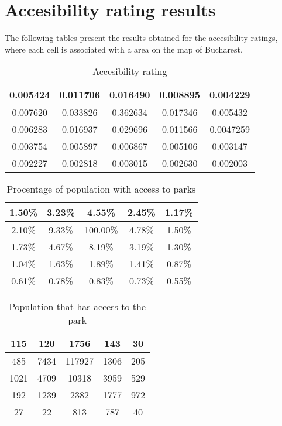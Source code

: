 \chapter{Accesibility rating results}
\label{chap:acc-rating}

The following tables present the results obtained for the accesibility ratings, where each cell is associated with a area on the map of Bucharest.

\begin{center}
\begin{table}[htb]
  \caption{Accesibility rating}
  \begin{tabular}{|c|c|c|c|c|}
	\hline
   	0.005424 	& 	0.011706	& 	0.016490	&	0.008895	& 	0.004229 \\
	\hline
   	0.007620 	& 	0.033826	& 	0.362634	&	0.017346	& 	0.005432 \\
	\hline
   	0.006283 	& 	0.016937	& 	0.029696	&	0.011566	& 	0.0047259 \\
	\hline
   	0.003754 	& 	0.005897	& 	0.006867	&	0.005106	& 	0.003147 \\
	\hline
   	0.002227 	& 	0.002818	& 	0.003015	&	0.002630	& 	0.002003 \\
	\hline
  \end{tabular}
  \label{table:reports}
\end{table}
\end{center}


\begin{center}
\begin{table}[htb]
  \caption{Procentage of population with access to parks}
  \begin{tabular}{|c|c|c|c|c|}
	\hline
	1.50\%		&	3.23\%		&	4.55\%		&	2.45\%		&	1.17\% \\
	\hline
	2.10\%		&	9.33\%		&	100.00\%	&	4.78\%		&	1.50\% \\
	\hline
	1.73\%		&	4.67\%		&	8.19\%		&	3.19\%		&	1.30\% \\
	\hline
	1.04\%		&	1.63\%		&	1.89\%		&	1.41\%		&	0.87\% \\
	\hline
	0.61\%		&	0.78\%		&	0.83\%		&	0.73\%		&	0.55\% \\
	\hline
  \end{tabular}
  \label{table:reports}
\end{table}
\end{center}


\begin{center}
\begin{table}[htb]
  \caption{Population that has access to the park}
  \begin{tabular}{|c|c|c|c|c|}
	\hline
	115		&	120		&	1756		&	143		&	30 \\
	\hline
	485		&	7434		&	117927		&	1306		&	205 \\
	\hline
	1021		&	4709		&	10318		&	3959		&	529 \\
	\hline
	192		&	1239		&	2382		&	1777		&	972 \\
	\hline
	27		&	22		&	813		&	787		&	40 \\
	\hline
  \end{tabular}
  \label{table:reports}
\end{table}
\end{center}

